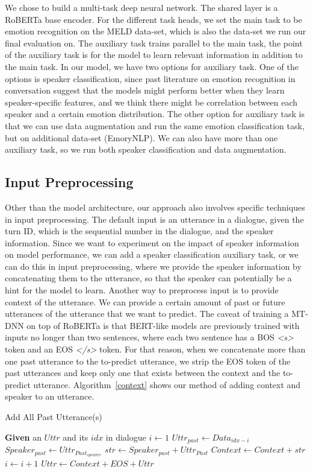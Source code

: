 \documentclass[11pt]{article}
\begin{document}
We chose to build a multi-task deep neural network. The shared layer is a RoBERTa base encoder. For the different task heads, we set the main task to be emotion recognition on the MELD data-set, which is also the data-set we run our final evaluation on. The auxiliary task trains parallel to the main task, the point of the auxiliary task is for the model to learn relevant information in addition to the main task. In our model, we have two options for auxiliary task. One of the options is speaker classification, since past literature on emotion recognition in conversation suggest that the models might perform better when they learn speaker-specific features, and we think there might be correlation between each speaker and a certain emotion distribution. The other option for auxiliary task is that we can use data augmentation and run the same emotion classification task, but on additional data-set (EmoryNLP). We can also have more than one auxiliary task, so we run both speaker classification and data augmentation.

\subsection{Input Preprocessing}
Other than the model architecture, our approach also involves specific techniques in input preprocessing. The default input is an utterance in a dialogue, given the turn ID, which is the sequential number in the dialogue, and the speaker information. Since we want to experiment on the impact of speaker information on model performance, we can add a speaker classification auxiliary task, or we can do this in input preprocessing, where we provide the speaker information by concatenating them to the utterance, so that the speaker can potentially be a hint for the model to learn. Another way to preprocess input is to provide context of the utterance. We can provide a certain amount of past or future utterances of the utterance that we want to predict. The caveat of training a MT-DNN on top of RoBERTa is that BERT-like models are previously trained with inputs no longer than two sentences, where each two sentence has a BOS \textit{<s>} token and an EOS \textit{</s>} token. For that reason, when we concatenate more than one past utterance to the to-predict utterance, we strip the EOS token of the past utterances and keep only one that exists between the context and the to-predict utterance. Algorithm~\ref{context} shows our method of adding context and speaker to an utterance.
\begin{algorithm}
\caption{Add All Past Utterance(s)}\label{euclid}
\begin{algorithmic}[1]
\State \textbf{Given} an $Uttr$ and its $idx$ in dialogue
    \State $i \gets 1$
        \State $Uttr_{past} \gets Data_{idx-i}$
        \State $Speaker_{past} \gets Uttr_{Past_{speaker}}$
        \State $str \gets Speaker_{past} + Uttr_{Past}$
        \State $Context \gets Context + str$
        \State $i \gets i + 1$
    \EndWhile
\EndIf
\State $Uttr \gets Context + EOS + Uttr$
\end{algorithmic}
\label{context}
\end{algorithm}
\end{document}
